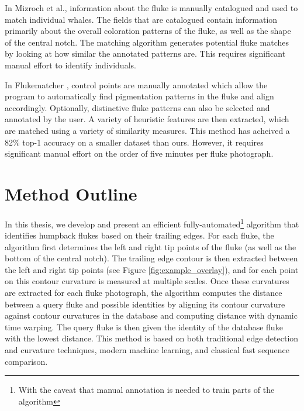 In Mizroch et al., information about the fluke is manually catalogued and used to match individual whales. 
The fields that are catalogued contain information primarily about the overall coloration patterns of the fluke, as well as the shape of the central notch. 
The matching algorithm generates potential fluke matches by looking at how similar the annotated patterns are.
This requires significant manual effort to identify individuals.

In Flukematcher \cite{kniest2010fluke}, control points are manually annotated which allow the program to automatically find pigmentation patterns in the fluke and align accordingly.
Optionally, distinctive fluke patterns can also be selected and annotated by the user.
A variety of heuristic features are then extracted, which are matched using a variety of similarity measures.
This method has acheived a 82\% top-1 accuracy on a smaller dataset than ours.
However, it requires significant manual effort on the order of five minutes per fluke photograph.

\section{Method Outline}


In this thesis, we develop and present an efficient fully-automated\footnote{With the caveat that manual annotation is needed to train parts of the algorithm} algorithm that identifies humpback flukes based on their trailing edges.
For each fluke, the algorithm first determines the left and right tip points of the fluke (as well as the bottom of the central notch). 
The trailing edge contour is then extracted between the left and right tip points (see Figure \ref{fig:example_overlay}), and for each point on this contour curvature is measured at multiple scales.
Once these curvatures are extracted for each fluke photograph, the algorithm computes the distance between a query fluke and possible identities by aligning its contour curvature against contour curvatures in the database and computing distance with dynamic time warping.
The query fluke is then given the identity of the database fluke with the lowest distance.
This method is based on both traditional edge detection and curvature techniques, modern machine learning, and classical fast sequence comparison.


